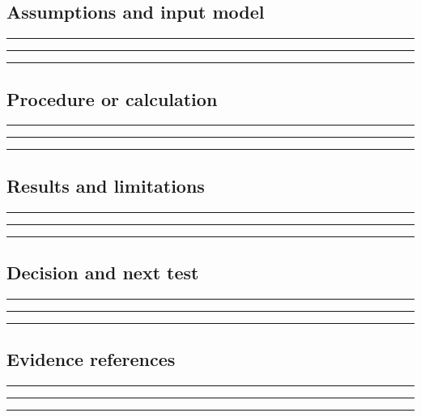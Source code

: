 \documentclass[11pt]{article}
\begin{document}
\subsection{Assumptions and input model}
\noindent\rule{\linewidth}{0.35pt}\par\vspace{0.22in}
\noindent\rule{\linewidth}{0.35pt}\par\vspace{0.22in}
\noindent\rule{\linewidth}{0.35pt}\par\vspace{0.18in}

\subsection{Procedure or calculation}
\noindent\rule{\linewidth}{0.35pt}\par\vspace{0.22in}
\noindent\rule{\linewidth}{0.35pt}\par\vspace{0.22in}
\noindent\rule{\linewidth}{0.35pt}\par\vspace{0.18in}

\subsection{Results and limitations}
\noindent\rule{\linewidth}{0.35pt}\par\vspace{0.22in}
\noindent\rule{\linewidth}{0.35pt}\par\vspace{0.22in}
\noindent\rule{\linewidth}{0.35pt}\par\vspace{0.18in}

\subsection{Decision and next test}
\noindent\rule{\linewidth}{0.35pt}\par\vspace{0.22in}
\noindent\rule{\linewidth}{0.35pt}\par\vspace{0.22in}
\noindent\rule{\linewidth}{0.35pt}\par\vspace{0.18in}

\subsection{Evidence references}
\noindent\rule{\linewidth}{0.35pt}\par\vspace{0.22in}
\noindent\rule{\linewidth}{0.35pt}\par\vspace{0.22in}
\noindent\rule{\linewidth}{0.35pt}\par\vspace{0.18in}
\clearpage
\end{document}
